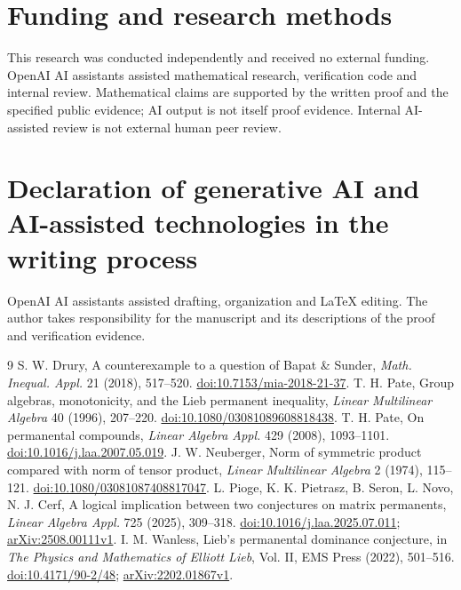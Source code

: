 \documentclass[11pt]{article}
\begin{document}
\section*{Funding and research methods}
This research was conducted independently and received no external
funding. OpenAI AI assistants assisted mathematical research, verification
code and internal review. Mathematical claims are supported by the
written proof and the specified public evidence; AI output is not itself
proof evidence. Internal AI-assisted review is not external human peer
review.
\section*{Declaration of generative AI and AI-assisted technologies
in the writing process}
OpenAI AI assistants assisted drafting, organization and LaTeX editing.
The author takes responsibility for the manuscript and its descriptions
of the proof and verification evidence.

\begin{thebibliography}{9}
 S. W. Drury, A counterexample to a question of Bapat \& Sunder,
\emph{Math. Inequal. Appl.} 21 (2018), 517--520.
\href{https://doi.org/10.7153/mia-2018-21-37}{doi:10.7153/mia-2018-21-37}.
 T. H. Pate, Group algebras, monotonicity, and the Lieb permanent
inequality, \emph{Linear Multilinear Algebra} 40 (1996), 207--220.
\href{https://doi.org/10.1080/03081089608818438}{doi:10.1080/03081089608818438}.
 T. H. Pate, On permanental compounds,
\emph{Linear Algebra Appl.} 429 (2008), 1093--1101.
\href{https://doi.org/10.1016/j.laa.2007.05.019}{doi:10.1016/j.laa.2007.05.019}.
 J. W. Neuberger, Norm of symmetric product compared with norm
of tensor product, \emph{Linear Multilinear Algebra} 2 (1974), 115--121.
\href{https://doi.org/10.1080/03081087408817047}{doi:10.1080/03081087408817047}.
 L. Pioge, K. K. Pietrasz, B. Seron, L. Novo, N. J. Cerf,
A logical implication between two conjectures on matrix permanents,
\emph{Linear Algebra Appl.} 725 (2025), 309--318.
\href{https://doi.org/10.1016/j.laa.2025.07.011}{doi:10.1016/j.laa.2025.07.011};
\href{https://arxiv.org/abs/2508.00111v1}{arXiv:2508.00111v1}.
 I. M. Wanless, Lieb's permanental dominance conjecture,
in \emph{The Physics and Mathematics of Elliott Lieb}, Vol. II,
EMS Press (2022), 501--516.
\href{https://doi.org/10.4171/90-2/48}{doi:10.4171/90-2/48};
\href{https://arxiv.org/abs/2202.01867v1}{arXiv:2202.01867v1}.
\end{thebibliography}
\end{document}
